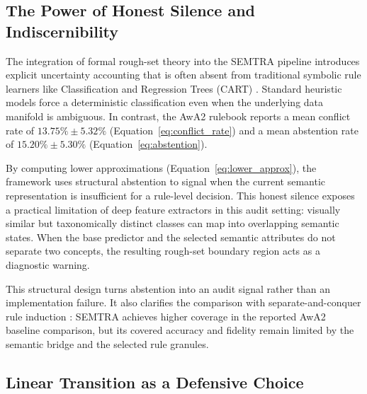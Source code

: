 \documentclass[make,article,submit,pdftex,moreauthors]{Definitions/mdpi}
\begin{document}
\subsection{The Power of Honest Silence and Indiscernibility}
\label{subsec:honest_silence}

The integration of formal rough-set theory \cite{Pawlak1982RoughSets, Pawlak1991RoughSets} into the SEMTRA pipeline introduces explicit uncertainty accounting that is often absent from traditional symbolic rule learners like Classification and Regression Trees (CART) \cite{Mienye2024DecisionTrees}. Standard heuristic models force a deterministic classification even when the underlying data manifold is ambiguous. In contrast, the AwA2 rulebook reports a mean conflict rate of $13.75\% \pm 5.32\%$ (Equation~\eqref{eq:conflict_rate}) and a mean abstention rate of $15.20\% \pm 5.30\%$ (Equation~\eqref{eq:abstention}).

By computing lower approximations (Equation~\eqref{eq:lower_approx}), the framework uses structural abstention to signal when the current semantic representation is insufficient for a rule-level decision. This honest silence exposes a practical limitation of deep feature extractors in this audit setting: visually similar but taxonomically distinct classes can map into overlapping semantic states. When the base predictor and the selected semantic attributes do not separate two concepts, the resulting rough-set boundary region acts as a diagnostic warning.

This structural design turns abstention into an audit signal rather than an implementation failure. It also clarifies the comparison with separate-and-conquer rule induction \cite{Bollaert2024FRRI}: SEMTRA achieves higher coverage in the reported AwA2 baseline comparison, but its covered accuracy and fidelity remain limited by the semantic bridge and the selected rule granules.

\subsection{Linear Transition as a Defensive Choice}
\label{subsec:linear_transition}
\end{document}
